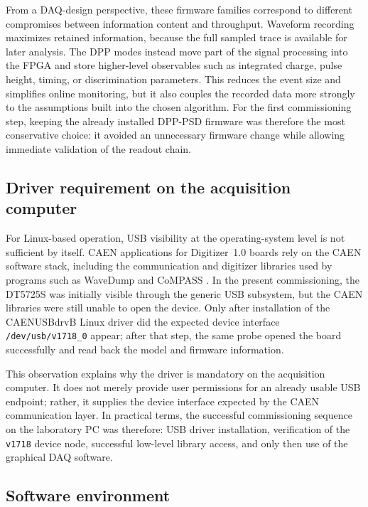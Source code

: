 From a DAQ-design perspective, these firmware families correspond to different compromises between information content and throughput. Waveform recording maximizes retained information, because the full sampled trace is available for later analysis. The DPP modes instead move part of the signal processing into the FPGA and store higher-level observables such as integrated charge, pulse height, timing, or discrimination parameters. This reduces the event size and simplifies online monitoring, but it also couples the recorded data more strongly to the assumptions built into the chosen algorithm. For the first commissioning step, keeping the already installed DPP-PSD firmware was therefore the most conservative choice: it avoided an unnecessary firmware change while allowing immediate validation of the readout chain.

\subsection{Driver requirement on the acquisition computer}

For Linux-based operation, USB visibility at the operating-system level is not sufficient by itself. CAEN applications for Digitizer~1.0 boards rely on the CAEN software stack, including the communication and digitizer libraries used by programs such as WaveDump and CoMPASS \citep{CAENWaveDumpPage,CAENUSBDriverReadme2024}. In the present commissioning, the DT5725S was initially visible through the generic USB subsystem, but the CAEN libraries were still unable to open the device. Only after installation of the CAENUSBdrvB Linux driver did the expected device interface \texttt{/dev/usb/v1718\_0} appear; after that step, the same probe opened the board successfully and read back the model and firmware information.

This observation explains why the driver is mandatory on the acquisition computer. It does not merely provide user permissions for an already usable USB endpoint; rather, it supplies the device interface expected by the CAEN communication layer. In practical terms, the successful commissioning sequence on the laboratory PC was therefore: USB driver installation, verification of the \texttt{v1718} device node, successful low-level library access, and only then use of the graphical DAQ software.

\subsection{Software environment}

